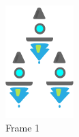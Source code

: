 \begin{figure}[!h]
  \includegraphics[width=\linewidth]{chapters/modding/fleetDetails_3.png}
  \caption*{Frame 1}
\endminipage\hfill
{}%

\end{figure}
